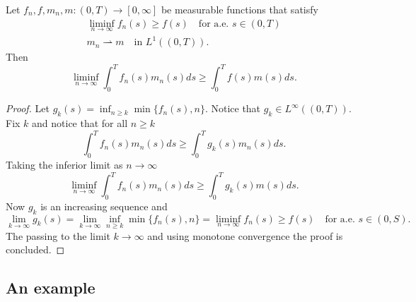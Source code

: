 \begin{lemma}
\label{lemma:technical-convergence-integral}
Let $f_n,f,m_n,m\colon(0,T)\to[0,\infty]$ be measurable functions that satisfy
\begin{gather*}
\liminf_{n\to\infty}f_n(s)\ge f(s)\quad\text{for a.e.\ $s\in(0,T)$} \\
m_n\rightharpoonup m\quad\text{in $L^1((0,T))$}.
\end{gather*}
Then
\[
\liminf_{n\to\infty}\int_0^Tf_n(s)m_n(s)ds\ge\int_0^Tf(s)m(s)ds.
\]
\end{lemma}
\begin{proof}
Let $g_k(s)=\inf_{n\ge k}\min\{f_n(s),n\}$. Notice that $g_k\in L^\infty((0,T))$. Fix $k$ and notice that for all $n\ge k$
\[
\int_0^Tf_n(s)m_n(s)ds\ge\int_0^Tg_k(s)m_n(s)ds.
\]
Taking the inferior limit as $n\to\infty$
\[
\liminf_{n\to\infty}\int_0^Tf_n(s)m_n(s)ds\ge\int_0^Tg_k(s)m(s)ds.
\]
Now $g_k$ is an increasing sequence and
\[
\lim_{k\to\infty}g_k(s)=\lim_{k\to\infty}\inf_{n\ge k}\min\{f_n(s),n\}=\liminf_{n\to\infty}f_n(s)\ge f(s)\quad\text{for a.e.\ $s\in(0,S)$}.
\]
The passing to the limit $k\to\infty$ and using monotone convergence the proof is concluded.
\end{proof}

\subsection{An example}

